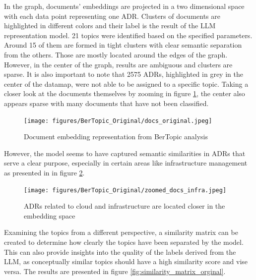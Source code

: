         In the graph, documents' embeddings are projected in a two dimensional space with each data point representing one ADR. Clusters of documents are highlighted in different colors and their label is the result of the LLM representation model. 21 topics were identified based on the specified parameters. Around 15 of them are formed in tight clusters with clear semantic separation from the others. Those are mostly located around the edges of the graph. However, in the center of the graph, results are ambiguous and clusters are sparse. It is also important to note that 2575 ADRs, highlighted in grey in the center of the datamap, were not able to be assigned to a specific topic. Taking a closer look at the documents themselves by zooming in figure \ref{fig:docs_original}, the center also appears sparse with many documents that have not been classified. 
        
        \begin{figure}[h]
            \centering
            \texttt{[image: figures/BerTopic\_Original/docs\_original.jpeg]}
            \caption{Document embedding representation from BerTopic analysis}
            \label{fig:docs_original}
        \end{figure}
        
        However, the model seems to have captured semantic similarities in ADRs that serve a clear purpose, especially in certain areas like infrastructure management as presented in in figure \ref{fig:infra_docs}.

        \begin{figure}[h]
            \centering
            \texttt{[image: figures/BerTopic\_Original/zoomed\_docs\_infra.jpeg]}
            \caption{ADRs related to cloud and infrastructure are located  closer in the embedding space}
            \label{fig:infra_docs}
        \end{figure}
        
        Examining the topics from a different perspective, a similarity matrix can be created to determine how clearly the topics have been separated by the model. This can also provide insights into the quality of the labels derived from the LLM, as conceptually similar topics should have a high similarity score and vise versa. The results are presented in figure \ref{fig:similarity_matrix_orginal}. 

        
